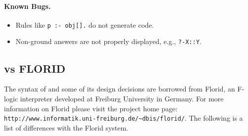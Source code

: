 \paragraph{Known Bugs.}

\begin{itemize}
\item Rules like \texttt{p :- obj[].}  do not generate code.
\item Non-ground answers are not properly displayed, e.g.,
  \texttt{?-X::Y}.
\end{itemize}

\subsection{\FLIP vs FLORID}

The syntax of \FLIP and some of its design decisions are borrowed from
Florid, an F-logic interpreter developed at Freiburg University in Germany.
For more information on Florid please visit the project home page:
\verb|http://www.informatik.uni-freiburg.de/~dbis/florid/|. The following
is a list of differences with the Florid system.

